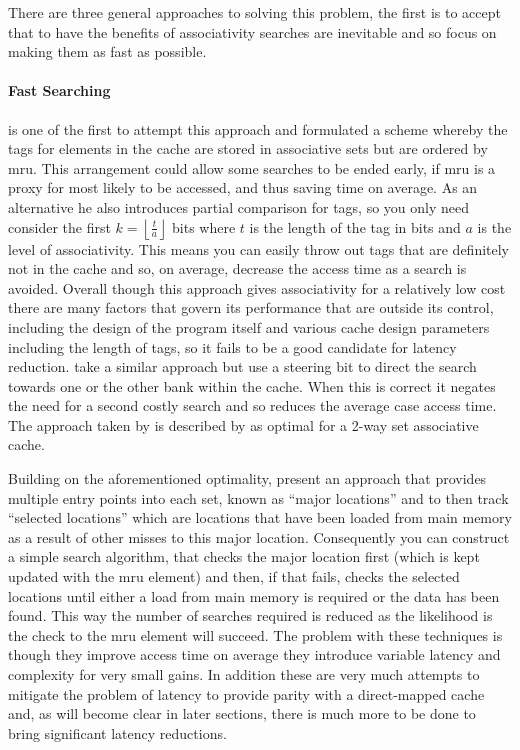 There are three general approaches to solving this problem, the first is to accept that to have the benefits of associativity searches are inevitable and so focus on making them as fast as possible.

\paragraph{Fast Searching}


\citet{kesslerInexpensiveImplementationsSetAssociativity1989} is one of the first to attempt this approach and formulated a scheme whereby the tags for elements in the cache are stored in associative sets but are ordered by \gls{mru}. This arrangement could allow some searches to be ended early, if \gls{mru} is a proxy for most likely to be accessed, and thus saving time on average. As an alternative he also introduces partial comparison for tags, so you only need consider the first $k = \left\lfloor\frac{t}{a}\right\rfloor$ bits where $t$ is the length of the tag in bits and $a$ is the level of associativity. This means you can easily throw out tags that are definitely not in the cache and so, on average, decrease the access time as a search is avoided. Overall though this approach gives associativity for a relatively low cost there are many factors that govern its performance that are outside its control, including the design of the program itself and various cache design parameters including the length of tags, so it fails to be a good candidate for latency reduction. \citet{calderPredictiveSequentialAssociative1996} take a similar approach but use a steering bit to direct the search towards one or the other bank within the cache. When this is correct it negates the need for a second costly search and so reduces the average case access time. The approach taken by \citeauthor{calderPredictiveSequentialAssociative1996} is described by 
\citet{zhangMulticolumnImplementationsCache1997} as optimal for a 2-way set associative cache.  

Building on the aforementioned optimality, \citeauthor{zhangMulticolumnImplementationsCache1997} present an approach that provides multiple entry points into each set, known as ``major locations'' and to then track ``selected locations'' which are locations that have been loaded from main memory as a result of other misses to this major location. Consequently you can construct a simple search algorithm, that checks the major location first (which is kept updated with the \gls{mru} element) and then, if that fails, checks the selected locations until either a load from main memory is required or the data has been found. This way the number of searches required is reduced as the likelihood is the check to the \gls{mru} element will succeed. The problem with these techniques is though they improve access time on average they introduce variable latency and complexity for very small gains. In addition these are very much attempts to mitigate the problem of latency to provide parity with a direct-mapped cache and, as will become clear in later sections, there is much more to be done to bring significant latency reductions.

